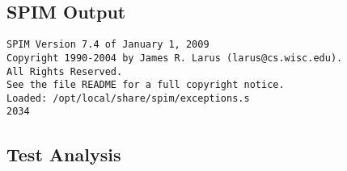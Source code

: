 \begin{lstlisting}[showstringspaces=false,breaklines=true,backgroundcolor=\color{light-gray}, captionpos=b]
\end{lstlisting}\subsection{SPIM Output}
\begin{verbatim}
SPIM Version 7.4 of January 1, 2009
Copyright 1990-2004 by James R. Larus (larus@cs.wisc.edu).
All Rights Reserved.
See the file README for a full copyright notice.
Loaded: /opt/local/share/spim/exceptions.s
2034
\end{verbatim}\subsection{Test Analysis}

